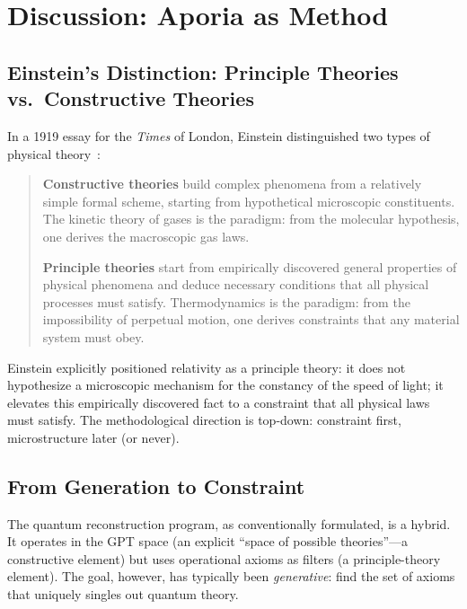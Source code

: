 \documentclass[12pt,a4paper]{article}
\theoremstyle{definition}
\theoremstyle{remark}
\begin{document}
\section{Discussion: Aporia as Method}
\label{sec:aporia}

\subsection{Einstein's Distinction: Principle Theories vs.\ Constructive Theories}

In a 1919 essay for the \textit{Times} of London, Einstein distinguished two types of physical theory~\cite{Einstein1919}:

\begin{quote}
\textbf{Constructive theories} build complex phenomena from a relatively simple formal scheme, starting from hypothetical microscopic constituents. The kinetic theory of gases is the paradigm: from the molecular hypothesis, one derives the macroscopic gas laws.

\textbf{Principle theories} start from empirically discovered general properties of physical phenomena and deduce necessary conditions that all physical processes must satisfy. Thermodynamics is the paradigm: from the impossibility of perpetual motion, one derives constraints that any material system must obey.
\end{quote}

Einstein explicitly positioned relativity as a principle theory: it does not hypothesize a microscopic mechanism for the constancy of the speed of light; it elevates this empirically discovered fact to a constraint that all physical laws must satisfy. The methodological direction is top-down: constraint first, microstructure later (or never).

\subsection{From Generation to Constraint}

The quantum reconstruction program, as conventionally formulated, is a hybrid. It operates in the GPT space (an explicit ``space of possible theories''---a constructive element) but uses operational axioms as filters (a principle-theory element). The goal, however, has typically been \emph{generative}: find the set of axioms that uniquely singles out quantum theory.
\end{document}
